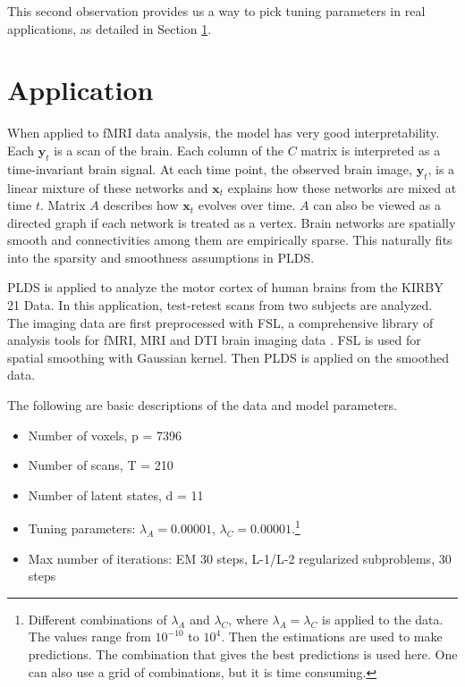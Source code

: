 \documentclass[fleqn]{article}
\let\oldref\ref
\renewcommand{\ref}[1]{(\oldref{#1})}
\begin{document}
This second observation provides us a way to pick tuning parameters in real applications, as detailed in Section \oldref{sec:application}.



\section{Application}
\label{sec:application}
When applied to fMRI data analysis, the model has very good interpretability. Each $\mathbf{y}_t$ is a scan of the brain. Each column of the $C$ matrix is interpreted as a time-invariant brain signal. At each time point, the observed brain image, $\mathbf{y}_t$, is a linear mixture of these networks and $\mathbf{x}_t$ explains how these networks are mixed at time $t$. Matrix $A$ describes how $\mathbf{x}_t$ evolves over time. $A$ can also be viewed as a directed graph if each network is treated as a vertex. Brain networks are spatially smooth and connectivities among them are empirically sparse. This naturally fits into the sparsity and smoothness assumptions in PLDS.

PLDS is applied to analyze the motor cortex of human brains from the KIRBY 21 Data. In this application, test-retest scans from two subjects are analyzed. The imaging data are first preprocessed with FSL, a comprehensive library of analysis tools for fMRI, MRI and DTI brain imaging data \cite{smith2004advances}. FSL is used for spatial smoothing with Gaussian kernel. Then PLDS is applied on the smoothed data.

The following are basic descriptions of the data and model parameters.
\begin{itemize}[noitemsep, topsep=0pt]
\item Number of voxels, p = 7396
\item Number of scans, T = 210
\item Number of latent states, d = 11
\item Tuning parameters: $\lambda_A = 0.00001$, $\lambda_C = 0.00001$.\footnote{Different combinations of $\lambda_A$ and $\lambda_C$, where $\lambda_A = \lambda_C$ is applied to the data. The values range from $10^{-10}$ to $10^{4}$. Then the estimations are used to make predictions. The combination that gives the best predictions is used here. One can also use a grid of combinations, but it is time consuming.}
\item Max number of iterations: EM 30 steps, L-1/L-2 regularized subproblems, 30 steps
\end{itemize}
\end{document}
